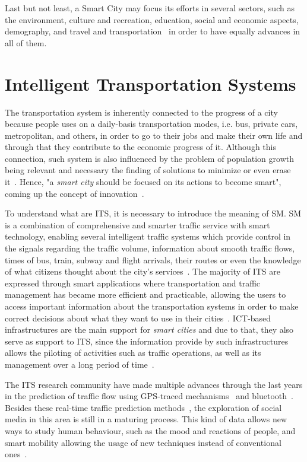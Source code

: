 Last but not least, a Smart City may focus its efforts in several sectors, such as the environment, culture and recreation, education, social and economic aspects, demography, and travel and transportation~\cite{caragliu2011smart} in order to have equally advances in all of them.

\section{Intelligent Transportation Systems}\label{sec:intelligent_transportation_systems}

The transportation system is inherently connected to the progress of a city because people uses on a daily-basis transportation modes, i.e. bus, private cars, metropolitan, and others, in order to go to their jobs and make their own life and through that they contribute to the economic progress of it. Although this connection, such system is also influenced by the problem of population growth being relevant and necessary the finding of solutions to minimize or even erase it~\cite{caragliu2015smart}. Hence, "a \textit{smart city} should be focused on its actions to become smart", coming up the concept of innovation~\cite{ulloa2016mining}.

To understand what are \gls{ITS}, it is necessary to introduce the meaning of \gls{SM}. \gls{SM} is a combination of comprehensive and smarter traffic service with smart technology, enabling several intelligent traffic systems which provide control in the signals regarding the traffic volume, information about smooth traffic flows, times of bus, train, subway and flight arrivals, their routes or even the knowledge of what citizens thought about the city's services~\cite{chun2015review}. The majority of \gls{ITS} are expressed through smart applications where transportation and traffic management has became more efficient and practicable, allowing the users to access important information about the transportation systems in order to make correct decisions about what they want to use in their cities~\cite{caragliu2015smart}. \gls{ICT}-based infrastructures are the main support for \textit{smart cities} and due to that, they also serve as support to \gls{ITS}, since the information provide by such infrastructures allows the piloting of activities such as traffic operations, as well as its  management over a long period of time~\cite{ulloa2016mining}.

The \gls{ITS} research community have made multiple advances through the last years in the prediction of traffic flow using GPS-traced mechanisms~\cite{sandim2016using} and bluetooth~\cite{filgueiras2014sensing}. Besides these real-time traffic prediction methods~\cite{barros2015short}, the exploration of social media in this area is still in a maturing process. This kind of data allows new ways to study human behaviour, such as the mood and reactions of people, and smart mobility allowing the usage of new techniques instead of conventional ones~\cite{liu2013understanding}.

